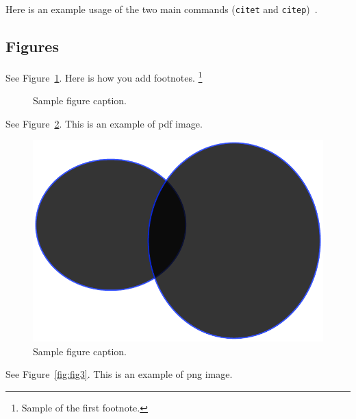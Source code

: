 \documentclass[article,slovene]{stucosrec}
\begin{document}
	Here is an example usage of the two main commands (\verb+citet+ and \verb+citep+)~\cite{vrbancic2019transfer}.
	
	\subsection{Figures}
	\lipsum[10]
	See Figure~\ref{fig:fig1}. Here is how you add footnotes. \footnote{Sample of the first footnote.}
	\lipsum[11]
	
	\begin{figure}[H]
		\centering
		\fbox{\rule[-.5cm]{4cm}{4cm} \rule[-.5cm]{4cm}{0cm}}
		\caption{Sample figure caption.}
		\label{fig:fig1}
	\end{figure}
	
	See Figure~\ref{fig:fig2}. This is an example of pdf image.
	
	\begin{figure}[b!]
		\centering
		\includegraphics[scale=.5]{circles.pdf}
		\caption{Sample figure caption.}
		\label{fig:fig2}
	\end{figure}
	
	See Figure~\ref{fig:fig3}. This is an example of png image.
	
\end{document}

